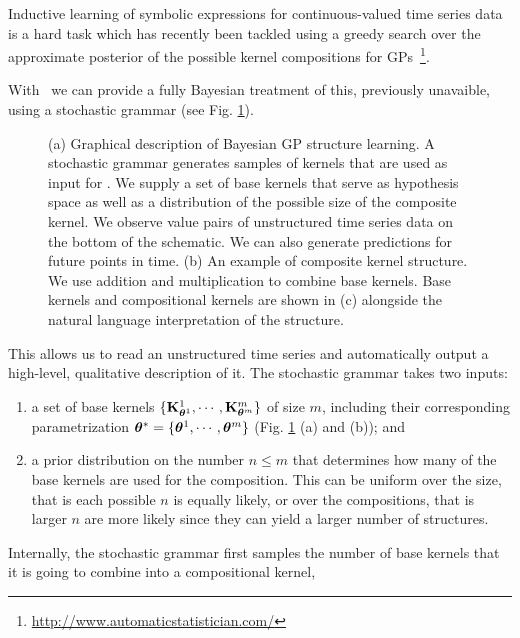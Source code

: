 Inductive learning of symbolic expressions for continuous-valued time series
data is a hard task which has recently been tackled using a greedy search over 
the approximate posterior of the possible kernel compositions for
\ac{GP}s~\citep{duvenaud2013structure,lloyd2014automatic}\footnote{\url{http://www.automaticstatistician.com/}}.

With \gpmem\ we can provide a fully Bayesian treatment of this, previously unavaible,
using a stochastic grammar  (see Fig. \ref{fig:schema}).
\begin{figure}
\centering

\caption{(a) Graphical description of Bayesian GP structure learning. A
stochastic grammar generates samples of kernels that are used as input for
\gpmem. We supply a set of base kernels that serve as hypothesis space as well
as a distribution of the possible size of the composite kernel. We observe value pairs of unstructured time series data on the bottom of the schematic. We can also generate predictions for future points in time. (b) An example of composite kernel structure. We use addition and multiplication to combine base kernels.
Base kernels and compositional kernels are shown in (c) alongside the natural language interpretation of the structure.}\label{fig:schema}
\end{figure}
This allows us to read an unstructured time series and automatically output a high-level,
qualitative description of it. The stochastic grammar takes two inputs:
\begin{enumerate}
    \item a set of base kernels 
    $\{\mathbf{K}_{\bm{\theta}^1}^1,\cdots,\mathbf{K}_{\bm{\theta}^m}^m\}$
    of size $m$, including their corresponding parametrization
    $\bm{\theta}^*=\{\bm{\theta}^1,\cdots,\bm{\theta}^m\}$ (Fig. \ref{fig:schema} (a) and (b)); and
    \item a prior distribution on the number $n \leq m$ that determines how many of the base kernels are used for
    the composition. This can be uniform over the size, that is each possible
    $n$ is equally likely, or over the compositions, that is larger $n$ are more
    likely since they can yield a larger number of structures.
\end{enumerate}
Internally, the stochastic grammar first samples the number of base kernels that it is
going to combine into a compositional kernel,
